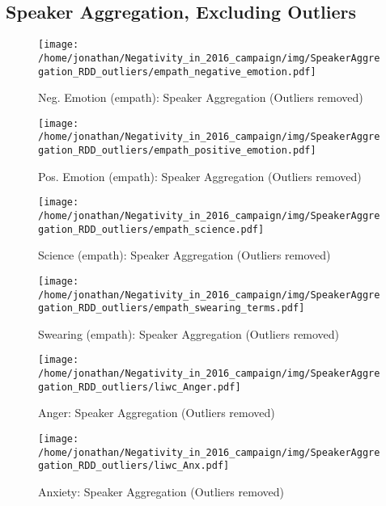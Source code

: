 \clearpage
\pagebreak

\subsection{Speaker Aggregation, Excluding Outliers}

\begin{figure}[h]\centering
	\texttt{[image: /home/jonathan/Negativity\_in\_2016\_campaign/img/SpeakerAggregation\_RDD\_outliers/empath\_negative\_emotion.pdf]}
	\caption{Neg. Emotion (empath): Speaker Aggregation (Outliers removed)}
	\label{fig: sa_Neg. Emotion (empath)}
\end{figure}

\begin{figure}[h]\centering
	\texttt{[image: /home/jonathan/Negativity\_in\_2016\_campaign/img/SpeakerAggregation\_RDD\_outliers/empath\_positive\_emotion.pdf]}
	\caption{Pos. Emotion (empath): Speaker Aggregation (Outliers removed)}
	\label{fig: sa_Pos. Emotion (empath)}
\end{figure}

\begin{figure}[h]\centering
	\texttt{[image: /home/jonathan/Negativity\_in\_2016\_campaign/img/SpeakerAggregation\_RDD\_outliers/empath\_science.pdf]}
	\caption{Science (empath): Speaker Aggregation (Outliers removed)}
	\label{fig: sa_Science (empath)}
\end{figure}

\begin{figure}[h]\centering
	\texttt{[image: /home/jonathan/Negativity\_in\_2016\_campaign/img/SpeakerAggregation\_RDD\_outliers/empath\_swearing\_terms.pdf]}
	\caption{Swearing (empath): Speaker Aggregation (Outliers removed)}
	\label{fig: sa_Swearing (empath)}
\end{figure}

\begin{figure}[h]\centering
	\texttt{[image: /home/jonathan/Negativity\_in\_2016\_campaign/img/SpeakerAggregation\_RDD\_outliers/liwc\_Anger.pdf]}
	\caption{Anger: Speaker Aggregation (Outliers removed)}
	\label{fig: sa_Anger}
\end{figure}

\begin{figure}[h]\centering
	\texttt{[image: /home/jonathan/Negativity\_in\_2016\_campaign/img/SpeakerAggregation\_RDD\_outliers/liwc\_Anx.pdf]}
	\caption{Anxiety: Speaker Aggregation (Outliers removed)}
	\label{fig: sa_Anxiety}
\end{figure}

